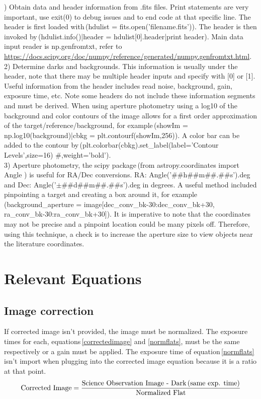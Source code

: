 \documentclass[onecolumn]{aastex6}
\begin{document}
) Obtain data and header information from .fits files. Print statements are very important, use exit(0) to debug issues and to end code at that specific line. The header is first loaded with\,(hdulist = fits.open('filename.fits')). The header is then invoked by\,(hdulist.info()|header = hdulist[0].header|print header). Main data input reader is np.genfromtxt, refer to \url{https://docs.scipy.org/doc/numpy/reference/generated/numpy.genfromtxt.html}.
\\
2) Determine darks and backgrounds. This information is usually under the header, note that there may be multiple header inputs and specify with [0] or [1]. Useful information from the header includes read noise, background, gain, exposure time, etc. Note some headers do not include these information segments and must be derived. When using aperture photometry using a log10 of the background and color contours of the image allows for a first order approximation of the target/reference/background, for example\,(showIm = np.log10(background)|cbkg = plt.contourf(showIm,256)). A color bar can be added to the contour by\,(plt.colorbar(cbkg).set\_label(label='Contour Levels',size=16) \#,weight='bold').
\\
3) Aperture photometry, the scipy package\,(from astropy.coordinates import Angle
) is useful for RA/Dec conversions. RA: Angle('\#\#h\#\#m\#\#.\#\#s').deg and Dec: Angle('$\pm$\#\#d\#\#m\#\#.\#\#s').deg in degrees. A useful method included pinpointing a target and creating a box around it, for example\,(background\_aperture = image[dec\_conv\_bk-30:dec\_conv\_bk+30, ra\_conv\_bk-30:ra\_conv\_bk+30]). It is imperative to note that the coordinates may not be precise and a pinpoint location could be many pixels off. Therefore, using this technique, a check is to increase the aperture size to view objects near the literature coordinates.
\clearpage
\section{Relevant Equations}

\subsection{Image correction}

If corrected image isn't provided, the image must be normalized. The exposure times for each, equations\,\ref{correctedimage} and \ref{normflats}, must be the same respectively or a gain must be applied. The exposure time of equation\,\ref{normflats} isn't import when plugging into the corrected image equation because it is a ratio at that point.
\begin{equation}
\text{Corrected Image} = \frac{\text{Science Observation Image - Dark\,(same exp. time)}}{\text{Normalized Flat}}
\label{correctedimage}
\end{equation}
\end{document}
